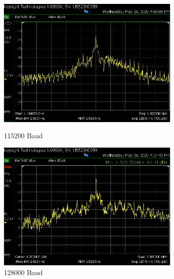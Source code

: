 \begin{figure}[H]
    \begin{minipage}{0.47\textwidth}
        \centering
        \includegraphics[width=0.8\textwidth]{Pictures/4.4C.115200.png}
        \caption*{115200 Baud}
    \end{minipage}
    \hfill
    \begin{minipage}{0.47\textwidth}
        \centering
        \includegraphics[width=0.8\textwidth]{Pictures/4.4C.128000.png}
        \caption*{128000 Baud}
    \end{minipage}


\end{figure}
